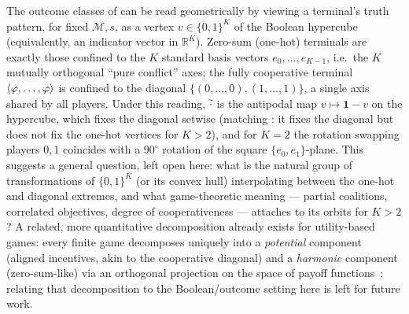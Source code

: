 \begin{remark}
\label{rem:outcome-geometry}
The outcome classes of  can be read geometrically by
viewing a terminal's truth pattern, for fixed $\mathcal M,s$, as a vertex
$v \in \{0,1\}^K$ of the Boolean hypercube (equivalently, an indicator vector
in $\mathbb{R}^K$). Zero-sum (one-hot) terminals are exactly those confined to the
$K$ standard basis vectors $e_0,\dots,e_{K-1}$, i.e.\ the $K$ mutually
orthogonal ``pure conflict'' axes; the fully cooperative terminal
$\langle \varphi,\dots,\varphi\rangle$ is confined to the diagonal
$\{(0,\dots,0),(1,\dots,1)\}$, a single axis shared by all players. Under
this reading, $\widetilde{\cdot}$ is the antipodal map $v \mapsto \mathbf 1 - v$ on the
hypercube, which fixes the diagonal setwise (matching
: it fixes the diagonal but does not fix
the one-hot vertices for $K>2$), and for $K=2$ the rotation swapping
players $0,1$ coincides with a $90^\circ$ rotation of the square
$\{e_0,e_1\}$-plane. This suggests a general question, left open here: what
is the natural group of transformations of $\{0,1\}^K$ (or its convex hull)
interpolating between the one-hot and diagonal extremes, and what
game-theoretic meaning --- partial coalitions, correlated objectives, degree
of cooperativeness --- attaches to its orbits for $K>2$? A related, more
quantitative decomposition already exists for utility-based games: every
finite game decomposes uniquely into a \emph{potential} component (aligned
incentives, akin to the cooperative diagonal) and a \emph{harmonic}
component (zero-sum-like) via an orthogonal projection on the space of
payoff functions~\cite{candogan2011flows}; relating that decomposition to
the Boolean/outcome setting here is left for future work.
\end{remark}
